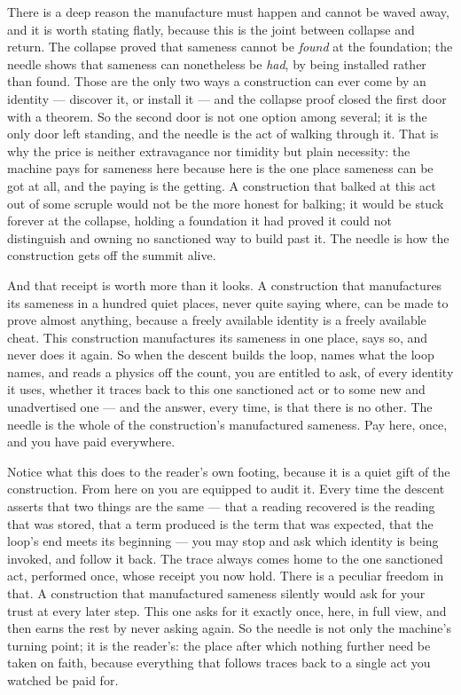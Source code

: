 There is a deep reason the manufacture must happen and cannot be waved away, and it is worth stating flatly,
because this is the joint between collapse and return. The collapse proved that sameness cannot be
\emph{found} at the foundation; the needle shows that sameness can nonetheless be \emph{had}, by being installed
rather than found. Those are the only two ways a construction can ever come by an identity --- discover it, or
install it --- and the collapse proof closed the first door with a theorem. So the second door is not one option
among several; it is the only door left standing, and the needle is the act of walking through it. That is why the
price is neither extravagance nor timidity but plain necessity: the machine pays for sameness here because here is
the one place sameness can be got at all, and the paying is the getting. A construction that balked at this act
out of some scruple would not be the more honest for balking; it would be stuck forever at the collapse, holding a
foundation it had proved it could not distinguish and owning no sanctioned way to build past it. The needle is how
the construction gets off the summit alive.

And that receipt is worth more than it looks. A construction that manufactures its sameness in a hundred quiet
places, never quite saying where, can be made to prove almost anything, because a freely available identity is a
freely available cheat. This construction manufactures its sameness in one place, says so, and never does it
again. So when the descent builds the loop, names what the loop names, and reads a physics off the count, you are
entitled to ask, of every identity it uses, whether it traces back to this one sanctioned act or to some new and
unadvertised one --- and the answer, every time, is that there is no other. The needle is the whole
of the construction's manufactured sameness. Pay here, once, and you have paid everywhere.

Notice what this does to the reader's own footing, because it is a quiet gift of the construction. From here on
you are equipped to audit it. Every time the descent asserts that two things are the same --- that a reading
recovered is the reading that was stored, that a term produced is the term that was expected, that the loop's end
meets its beginning --- you may stop and ask which identity is being invoked, and follow it back. The trace always
comes home to the one sanctioned act, performed once, whose receipt you now hold. There is a peculiar freedom in
that. A construction that manufactured sameness silently would ask for your trust at every later step. This one
asks for it exactly once, here, in full view, and then earns the rest by never asking again. So the needle is not
only the machine's turning point; it is the reader's: the place after which nothing further need be taken on
faith, because everything that follows traces back to a single act you watched be paid for.

